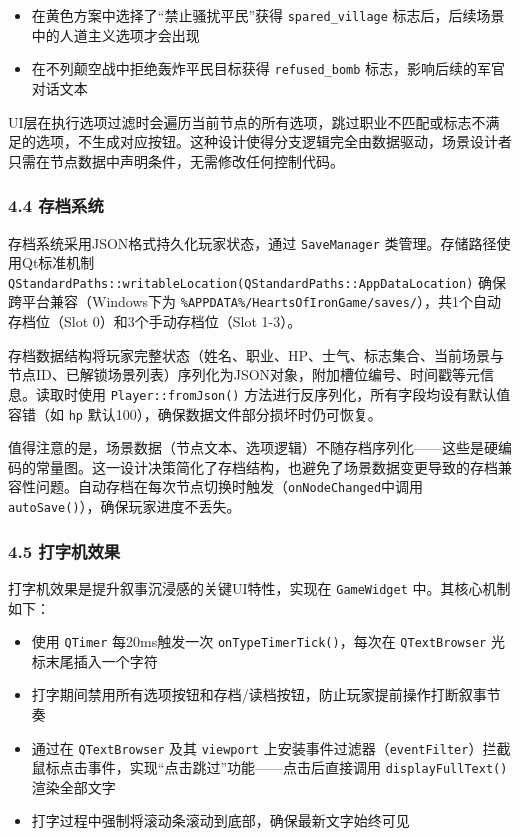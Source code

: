 \begin{itemize}
\tightlist
\item
  在黄色方案中选择了``禁止骚扰平民''获得 \texttt{spared\_village}
  标志后，后续场景中的人道主义选项才会出现
\item
  在不列颠空战中拒绝轰炸平民目标获得 \texttt{refused\_bomb}
  标志，影响后续的军官对话文本
\end{itemize}

UI层在执行选项过滤时会遍历当前节点的所有选项，跳过职业不匹配或标志不满足的选项，不生成对应按钮。这种设计使得分支逻辑完全由数据驱动，场景设计者只需在节点数据中声明条件，无需修改任何控制代码。

\hypertarget{ux5b58ux6863ux7cfbux7edf}{%
\subsubsection{4.4 存档系统}\label{ux5b58ux6863ux7cfbux7edf}}

存档系统采用JSON格式持久化玩家状态，通过 \texttt{SaveManager}
类管理。存储路径使用Qt标准机制
\texttt{QStandardPaths::writableLocation(QStandardPaths::AppDataLocation)}
确保跨平台兼容（Windows下为
\texttt{\%APPDATA\%/HeartsOfIronGame/saves/}），共1个自动存档位（Slot
0）和3个手动存档位（Slot 1-3）。

存档数据结构将玩家完整状态（姓名、职业、HP、士气、标志集合、当前场景与节点ID、已解锁场景列表）序列化为JSON对象，附加槽位编号、时间戳等元信息。读取时使用
\texttt{Player::fromJson()}
方法进行反序列化，所有字段均设有默认值容错（如 \texttt{hp}
默认100），确保数据文件部分损坏时仍可恢复。

值得注意的是，场景数据（节点文本、选项逻辑）不随存档序列化------这些是硬编码的常量图。这一设计决策简化了存档结构，也避免了场景数据变更导致的存档兼容性问题。自动存档在每次节点切换时触发（\texttt{onNodeChanged}中调用
\texttt{autoSave()}），确保玩家进度不丢失。

\hypertarget{ux6253ux5b57ux673aux6548ux679c}{%
\subsubsection{4.5 打字机效果}\label{ux6253ux5b57ux673aux6548ux679c}}

打字机效果是提升叙事沉浸感的关键UI特性，实现在 \texttt{GameWidget}
中。其核心机制如下：

\begin{itemize}
\tightlist
\item
  使用 \texttt{QTimer} 每20ms触发一次 \texttt{onTypeTimerTick()}，每次在
  \texttt{QTextBrowser} 光标末尾插入一个字符
\item
  打字期间禁用所有选项按钮和存档/读档按钮，防止玩家提前操作打断叙事节奏
\item
  通过在 \texttt{QTextBrowser} 及其 \texttt{viewport}
  上安装事件过滤器（\texttt{eventFilter}）拦截鼠标点击事件，实现``点击跳过''功能------点击后直接调用
  \texttt{displayFullText()} 渲染全部文字
\item
  打字过程中强制将滚动条滚动到底部，确保最新文字始终可见
\end{itemize}

